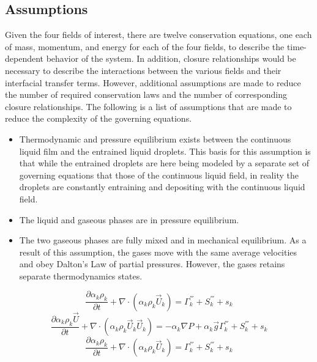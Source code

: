 \subsection{Assumptions}
\label{subsect:assumptions}
Given the four fields of interest, there are twelve conservation equations, one each of mass, momentum, and energy for each of the four fields, to describe the time-dependent behavior of the system.
In addition, closure relationships would be necessary to describe the interactions between the various fields and their interfacial transfer terms.
However, additional assumptions are made to reduce the number of required conservation laws and the number of corresponding closure relationships.
The following is a list of assumptions that are made to reduce the complexity of the governing equations.

\begin{itemize}
\item{
Thermodynamic and pressure equilibrium exists between the continuous liquid film and the entrained liquid droplets.
This basis for this assumption is that while the entrained droplets are here being modeled by a separate set of governing equations that those of the continuous liquid field, in reality the droplets are constantly entraining and depositing with the continuous liquid field. 
}
\item{
The liquid and gaseous phases are in pressure equilibrium.
}
\item{
The two gaseous phases are fully mixed and in mechanical equilibrium.
As a result of this assumption, the gases move with the same average velocities and obey Dalton's Law of partial pressures.
However, the gases retains separate thermodynamics states.
}
\end{itemize}

\begin{equation}
\label{eqn:conservation_of_mass}
\frac{\partial \alpha_k \rho_k }{\partial t } + \nabla \cdot \left( \alpha_k \rho_k \vec{U}_k \right) = \Gamma^{'''}_k + S^{'''}_k + s_k
\end{equation}
\begin{equation}
\label{eqn:conservation_of_momentum}
\frac{\partial \alpha_k \rho_k \vec{U} }{\partial t } + \nabla \cdot \left( \alpha_k \rho_k \vec{U}_k \vec{U}_k \right) = -\alpha_k \nabla P + \alpha_k \vec{g} \Gamma^{'''}_k + S^{'''}_k + s_k
\end{equation}
\begin{equation}
\label{eqn:conservation_of_energy}
\frac{\partial \alpha_k \rho_k }{\partial t } + \nabla \cdot \left( \alpha_k \rho_k \vec{U}_k \right) = \Gamma^{'''}_k + S^{'''}_k + s_k
\end{equation}


